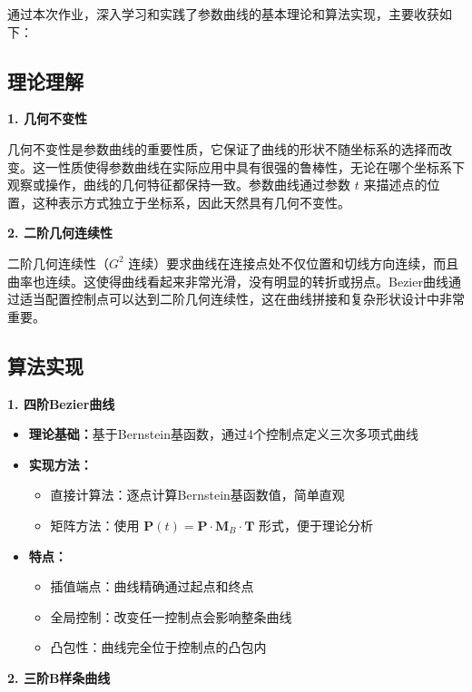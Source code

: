 \documentclass[12pt,a4paper]{article}
\begin{document}
\begin{tcolorbox}[breakable]
通过本次作业，深入学习和实践了参数曲线的基本理论和算法实现，主要收获如下：

\subsection{理论理解}

\textbf{1. 几何不变性}

几何不变性是参数曲线的重要性质，它保证了曲线的形状不随坐标系的选择而改变。这一性质使得参数曲线在实际应用中具有很强的鲁棒性，无论在哪个坐标系下观察或操作，曲线的几何特征都保持一致。参数曲线通过参数 $t$ 来描述点的位置，这种表示方式独立于坐标系，因此天然具有几何不变性。

\textbf{2. 二阶几何连续性}

二阶几何连续性（$G^2$ 连续）要求曲线在连接点处不仅位置和切线方向连续，而且曲率也连续。这使得曲线看起来非常光滑，没有明显的转折或拐点。Bezier曲线通过适当配置控制点可以达到二阶几何连续性，这在曲线拼接和复杂形状设计中非常重要。

\subsection{算法实现}

\textbf{1. 四阶Bezier曲线}

\begin{itemize}
\item \textbf{理论基础：}基于Bernstein基函数，通过4个控制点定义三次多项式曲线
\item \textbf{实现方法：}
  \begin{itemize}
  \item 直接计算法：逐点计算Bernstein基函数值，简单直观
  \item 矩阵方法：使用 $\mathbf{P}(t) = \mathbf{P} \cdot \mathbf{M}_B \cdot \mathbf{T}$ 形式，便于理论分析
  \end{itemize}
\item \textbf{特点：}
  \begin{itemize}
  \item 插值端点：曲线精确通过起点和终点
  \item 全局控制：改变任一控制点会影响整条曲线
  \item 凸包性：曲线完全位于控制点的凸包内
  \end{itemize}
\end{itemize}

\textbf{2. 三阶B样条曲线}


\end{tcolorbox}
\end{document}
